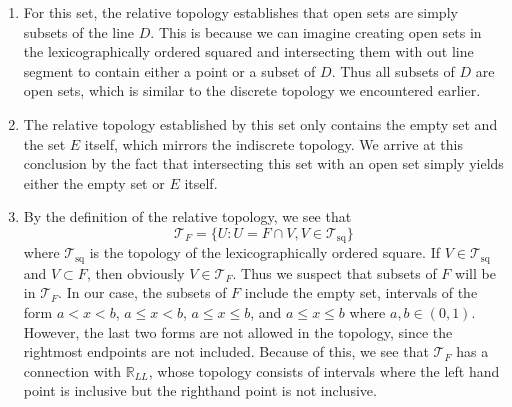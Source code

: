 \documentclass[a4paper,12pt,twoside]{hmcpset}
\begin{document}
\begin{solution}
    \begin{enumerate}
        \item For this set, the relative topology establishes that open sets are
        simply subsets of the line $D$. This is because we can imagine
        creating open sets in the lexicographically ordered squared and
        intersecting them with out line segment to contain either a point or a
        subset of $D$. Thus all subsets of $D$ are open sets, which is similar
        to the discrete topology we encountered earlier.
    
        \item The relative topology established by this set only contains the
        empty set and the set $E$ itself, which mirrors the indiscrete
        topology. We arrive at this conclusion by the fact that intersecting
        this set with an open set simply yields either the empty set or $E$
        itself.
    
        \item By the definition of the relative topology, we see that 
        $$
            \mathscr{T}_F = \{U : U = F \cap V, V \in \mathscr{T}_\text{sq}\}
        $$
        where $\mathscr{T}_\text{sq}$ is the topology of the lexicographically
        ordered square. If $V \in \mathscr{T}_\text{sq}$ and $V \subset F$, then 
        obviously $V \in \mathscr{T}_F$. Thus we suspect that subsets of $F$ 
        will be in $\mathscr{T}_F$. 
        In our case, the subsets of $F$ include the empty set, intervals 
        of the form $a < x < b$, $a \le x < b$, $a \le x \le b$, and $a \le x \le
        b$ where $a, b \in (0, 1)$. However, the last two forms are not allowed in 
        the topology, since the rightmost endpoints are not included. Because of 
        this, we see that $\mathscr{T}_F$ has a connection with $\mathbb{R}_{LL}$, 
        whose topology consists of intervals where the left hand point is inclusive 
        but the righthand point is not inclusive.
        
    \end{enumerate}
\end{solution}
\end{document}
